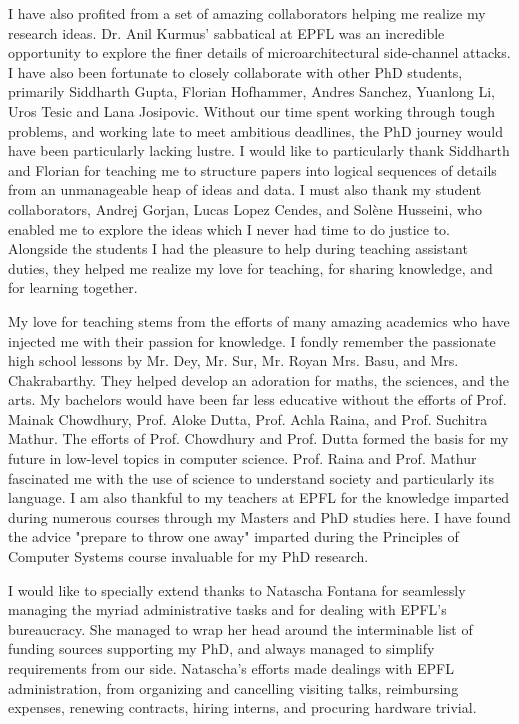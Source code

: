 I have also profited from a set of amazing collaborators helping me realize my
research ideas. 
Dr. Anil Kurmus' sabbatical at EPFL was an incredible opportunity to explore the
finer details of microarchitectural side-channel attacks.
I have also been fortunate to closely collaborate with other PhD students,
primarily Siddharth Gupta, Florian Hofhammer, Andres Sanchez, Yuanlong Li,
Uros Tesic and Lana Josipovic. 
Without our time spent working through tough problems, and working late to meet
ambitious deadlines, the PhD journey would have been particularly lacking lustre.
I would like to particularly thank Siddharth and Florian for teaching me to
structure papers into logical sequences of details from an unmanageable heap of
ideas and data.
I must also thank my student collaborators, Andrej Gorjan, Lucas Lopez Cendes, 
and Solène Husseini, who enabled me to 
explore the ideas which I never had time to do justice to. 
Alongside the students I had the pleasure to help during teaching assistant
duties, they helped me realize my love for teaching, for sharing knowledge,
and for learning together.

My love for teaching stems from the efforts of many amazing academics
who have injected me with their passion for knowledge.
I fondly remember the passionate high school lessons by 
Mr. Dey, Mr. Sur, Mr. Royan Mrs. Basu, and Mrs. Chakrabarthy.
They helped develop an adoration for maths, the sciences, and the arts.
My bachelors would have been far less educative without the efforts 
of Prof. Mainak Chowdhury, Prof. Aloke Dutta, Prof. Achla Raina,
and Prof. Suchitra Mathur.
The efforts of Prof. Chowdhury and Prof. Dutta formed the basis for my
future in low-level topics in computer science. 
Prof. Raina and Prof. Mathur fascinated me with the use of science to
understand society and particularly its language.
I am also thankful to my teachers at EPFL for the knowledge imparted during
numerous courses through my Masters and PhD studies here.
I have found the advice "prepare to throw one away" imparted during the
Principles of Computer Systems course invaluable for my PhD research.

I would like to specially extend thanks to Natascha Fontana for seamlessly 
managing the myriad administrative tasks and for dealing with EPFL's bureaucracy.
She managed to wrap her head around the interminable list of funding sources
supporting my PhD, and always managed to simplify requirements from our side.
Natascha's efforts made dealings with EPFL administration, from organizing and
cancelling visiting talks, reimbursing expenses, renewing contracts, 
hiring interns, and procuring hardware trivial.

